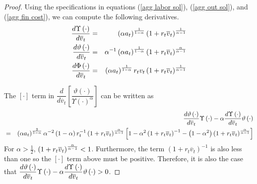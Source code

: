 \documentclass{article}
\begin{document}
\begin{proof}
Using the specifications in equations (\ref{agg labor sol}), (\ref{agg out
sol}), and (\ref{agg fin cost}), we can compute the following derivatives.
\begin{eqnarray*}
\frac{d\Upsilon \left( \cdot \right) }{d\overline{v}_{t}} &=&\left( \alpha
a_{t}\right) ^{\frac{1}{1-\alpha }}\left( 1+r_{t}\overline{v}_{t}\right) ^{%
\frac{1}{\alpha -1}} \\
\frac{d\vartheta \left( \cdot \right) }{d\overline{v}_{t}} &=&\alpha
^{-1}\left( \alpha a_{t}\right) ^{\frac{1}{1-\alpha }}\left( 1+r_{t}%
\overline{v}_{t}\right) ^{\frac{\alpha }{\alpha -1}} \\
\frac{d\Phi \left( \cdot \right) }{d\overline{v}_{t}} &=&\left( \alpha
a_{t}\right) ^{\frac{1}{1-\alpha }}r_{t}v_{t}\left( 1+r_{t}\overline{v}%
_{t}\right) ^{\frac{1}{\alpha -1}}
\end{eqnarray*}

The $\left[ \cdot \right]$ term in $\dfrac{d}{d\overline{v}_{t}}\left[
\dfrac{\vartheta \left( \cdot \right) }{\Upsilon \left( \cdot \right)
^{\alpha }}\right]$ can be written as
\begin{eqnarray*}
&&\frac{d\vartheta \left( \cdot \right) }{d\overline{v}_{t}}\Upsilon \left(
\cdot \right) -\alpha \frac{d\Upsilon \left( \cdot \right) }{d\overline{v}%
_{t}}\vartheta \left( \cdot \right) \\
&=&\left( \alpha a_{t}\right) ^{\frac{2}{1-\alpha }}\alpha ^{-2}\left(
1-\alpha \right) r_{t}^{-1}\left( 1+r_{t}\overline{v}_{t}\right) ^{\frac{%
\alpha }{\alpha -1}}\left[ 1-\alpha ^{2}\left( 1+r_{t}\overline{v}%
_{t}\right) ^{-1}-\left( 1-\alpha ^{2}\right) \left( 1+r_{t}\overline{v}%
_{t}\right) ^{\frac{\alpha }{\alpha -1}}\right]
\end{eqnarray*}
For $\alpha >\frac{1}{2}$, $\left( 1+r_{t}\overline{v}_{t}\right) ^{\frac{%
\alpha }{\alpha -1}}<1$. Furthermore, the term $\left( 1+r_{t}\overline{v}%
_{t}\right) ^{-1}$ is also less than one so the $\left[ \cdot \right]$ term
above must be positive. Therefore, it is also the case that $\dfrac{%
d\vartheta \left( \cdot \right) }{d\overline{v}_{t}}\Upsilon \left( \cdot
\right) -\alpha \dfrac{d\Upsilon \left( \cdot \right) }{d\overline{v}_{t}}%
\vartheta \left( \cdot \right) >0$.


\end{proof}
\end{document}
